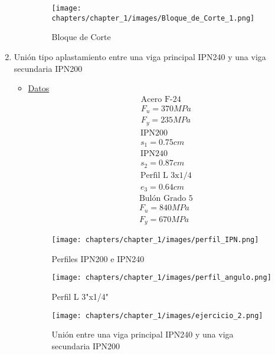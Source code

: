 \begin{enumerate}
\begin{itemize}
\begin{figure}[H]
\begin{center}
     \texttt{[image: chapters/chapter\_1/images/Bloque\_de\_Corte\_1.png]}
\end{center}
\caption{Bloque de Corte}
\end{figure}
\end{itemize}
\newpage
\item Unión tipo aplastamiento entre una viga principal IPN240 y una viga secundaria IPN200
\begin{itemize}
\item \underline{Datos}
\begin{align*}
& \text{Acero F-24}\\
& F_u = 370MPa\\
& F_y = 235MPa
\end{align*}
\begin{align*}
& \text{IPN200}\\
& s_1 = 0.75 cm\\
& \text{IPN240}\\
& s_2 = 0.87 cm\\
& \text{Perfil L 3x1/4}\\
& e_3 = 0.64 cm
\end{align*}
\begin{align*}
& \text{Bulón Grado 5}\\
& F_u = 840MPa\\
& F_y = 670MPa
\end{align*}

\begin{figure}[H]
\begin{center}
     \texttt{[image: chapters/chapter\_1/images/perfil\_IPN.png]}
\end{center}
\caption{Perfiles IPN200 e IPN240}
\end{figure}

\begin{figure}[H]
\begin{center}
     \texttt{[image: chapters/chapter\_1/images/perfil\_angulo.png]}
\end{center}
\caption{Perfil L 3"x1/4"}
\end{figure}

\begin{figure}[H]
\begin{center}
     \texttt{[image: chapters/chapter\_1/images/ejercicio\_2.png]}
\end{center}
\caption{Unión entre una viga principal IPN240 y una viga secundaria IPN200}
\end{figure}


\end{itemize}
\end{enumerate}
